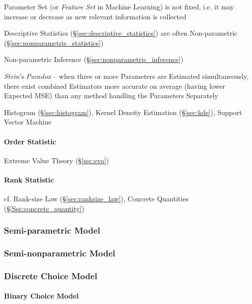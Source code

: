 Parameter Set (or \emph{Feature Set} in Machine Learning) is not fixed, i.e. it
may increase or decrease as new relevant information is collected

Descriptive Statistics (\S\ref{sec:descriptive_statistics}) are often
Non-parametric (\S\ref{sec:nonparametric_statistics})

\fist Non-parametric Inference (\S\ref{sec:nonparametric_inference})

\emph{Stein's Paradox} -- when three or more Parameters are Estimated
simultaneously, there exist combined Estimators more accurate on average (having
lower Expected MSE) than any method handling the Parameters Separately

Histogram (\S\ref{sec:histogram}), Kernel Density Estimation (\S\ref{sec:kde}),
Support Vector Machine



\paragraph{Order Statistic}\label{sec:order_statistic}\hfill

Extreme Value Theory (\S\ref{sec:eva})



\paragraph{Rank Statistic}\label{sec:rank_statistic}\hfill

cf. Rank-size Law (\S\ref{sec:ranksize_law}), Concrete Quantities
(\S\ref{Sec:concrete_quantity})



\subsubsection{Semi-parametric Model}\label{sec:semiparametric_model}

\subsubsection{Semi-nonparametric Model}\label{sec:seminonparametric_model}

\subsubsection{Discrete Choice Model}\label{sec:discrete_choice_model}

\paragraph{Binary Choice Model}\label{sec:binary_choice}\hfill

